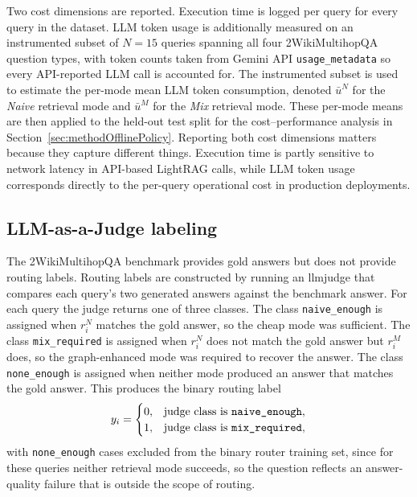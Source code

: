 \documentclass[english, bibtex]{kththesis}               %
\numberwithin{listing}{chapter}
\begin{document}
Two cost dimensions are reported. Execution time is logged per query for every query in the dataset. LLM token usage is additionally measured on an instrumented subset of $N=15$ queries spanning all four 2WikiMultihopQA question types, with token counts taken from Gemini API \texttt{usage\_metadata} so every API-reported LLM call is accounted for. The instrumented subset is used to estimate the per-mode mean LLM token consumption, denoted $\bar{u}^N$ for the \emph{Naive} retrieval mode and $\bar{u}^M$ for the \emph{Mix} retrieval mode. These per-mode means are then applied to the held-out test split for the cost--performance analysis in Section~\ref{sec:methodOfflinePolicy}. Reporting both cost dimensions matters because they capture different things. Execution time is partly sensitive to network latency in API-based LightRAG calls, while LLM token usage corresponds directly to the per-query operational cost in production deployments.

\subsection{LLM-as-a-Judge labeling}
\label{sec:methodJudge}

The 2WikiMultihopQA benchmark provides gold answers but does not provide routing labels. Routing labels are constructed by running an \gls{llmjudge} \cite{zheng2023judge} that compares each query's two generated answers against the benchmark answer. For each query the judge returns one of three classes. The class \texttt{naive\_enough} is assigned when \(r_i^N\) matches the gold answer, so the cheap mode was sufficient. The class \texttt{mix\_required} is assigned when \(r_i^N\) does not match the gold answer but \(r_i^M\) does, so the graph-enhanced mode was required to recover the answer. The class \texttt{none\_enough} is assigned when neither mode produced an answer that matches the gold answer.
This produces the binary routing label
\begin{equation}
\label{eq:routingLabel}
y_i =
\begin{cases}
0, & \text{judge class is \texttt{naive\_enough}},\\
1, & \text{judge class is \texttt{mix\_required}},
\end{cases}
\end{equation}
with \texttt{none\_enough} cases excluded from the binary router training set, since for these queries neither retrieval mode succeeds, so the question reflects an answer-quality failure that is outside the scope of routing.
\end{document}
